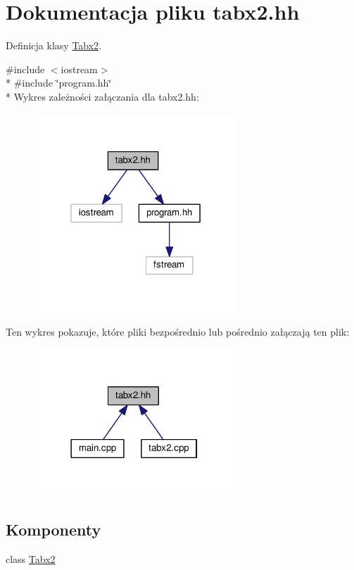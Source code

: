 \hypertarget{tabx2_8hh}{\section{Dokumentacja pliku tabx2.\-hh}
\label{tabx2_8hh}
}


Definicja klasy \hyperlink{class_tabx2}{Tabx2}.  


{\ttfamily \#include $<$iostream$>$}\\*
{\ttfamily \#include \char`\"{}program.\-hh\char`\"{}}\\*
Wykres zależności załączania dla tabx2.\-hh\-:
\nopagebreak
\begin{figure}[H]
\begin{center}
\leavevmode
\includegraphics[width=217pt]{tabx2_8hh__incl}
\end{center}
\end{figure}
Ten wykres pokazuje, które pliki bezpośrednio lub pośrednio załączają ten plik\-:
\nopagebreak
\begin{figure}[H]
\begin{center}
\leavevmode
\includegraphics[width=213pt]{tabx2_8hh__dep__incl}
\end{center}
\end{figure}
\subsection*{Komponenty}
\begin{DoxyCompactItemize}
\item 
class \hyperlink{class_tabx2}{Tabx2}
\end{DoxyCompactItemize}


